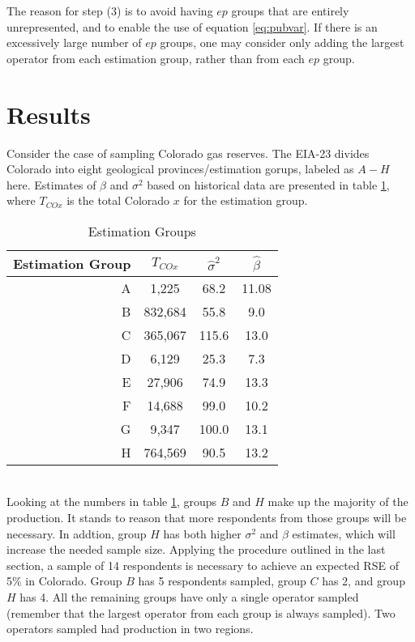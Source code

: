 \documentclass[11pt]{article}\usepackage[]{graphicx}\usepackage[]{color}
\begin{document}
The reason for step (3) is to avoid having $ep$ groups that are entirely unrepresented, and to enable the use of equation \ref{eq:pubvar}. If there is an excessively large number of $ep$ groups, one may consider only adding the largest operator from each estimation group, rather than from each $ep$ group.


\section{Results}
Consider the case of sampling Colorado gas reserves.  The EIA-23 divides Colorado into eight geological provinces/estimation gorups, labeled as $A-H$ here. Estimates of $\beta$ and $\sigma^2$ based on historical data are presented in table \ref{tab:E_ests}, where $T_{COx}$ is the total Colorado $x$ for the estimation group. 
\\
\begin{table}[h]
\begin{tabular}{r||c|c|c|} 
Estimation Group & $T_{CO x}$  & $\hat{\sigma}^2$ & $\hat{\beta}$\\
\hline
A & 1,225 & 68.2 & 11.08\\
B & 832,684 & 55.8 & 9.0 \\
C & 365,067 & 115.6 & 13.0 \\
D & 6,129 & 25.3 & 7.3 \\
E & 27,906 & 74.9 & 13.3 \\
F & 14,688 & 99.0 & 10.2 \\
G & 9,347 & 100.0 & 13.1 \\
H & 764,569 & 90.5 & 13.2 \\
\end{tabular}
\caption{Estimation Groups}
\label{tab:E_ests}
\end{table}
\\
Looking at the numbers in table \ref{tab:E_ests}, groups $B$ and $H$ make up the majority of the production. It stands to reason that more respondents from those groups will be necessary. In addtion, group $H$ has both higher $\sigma^2$ and $\beta$ estimates, which will increase the needed sample size. Applying the procedure outlined in the last section, a sample of 14 respondents is necessary to achieve an expected RSE of 5\% in Colorado. Group $B$ has 5 respondents sampled, group $C$ has 2, and group $H$ has 4. All the remaining groups have only a single operator sampled (remember that the largest operator from each group is always sampled). Two operators sampled had production in two regions.
\end{document}
